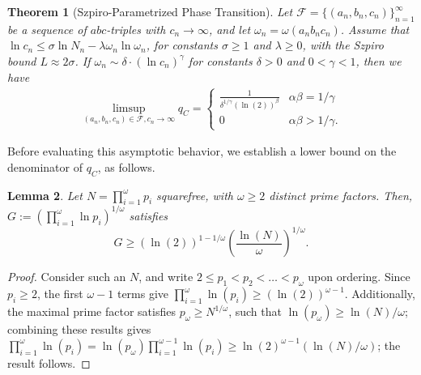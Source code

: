 \documentclass[11pt,letterpaper]{amsart}
\newtheorem{theorem}{Theorem}[section]
\newtheorem{lemma}[theorem]{Lemma}
\def\ra{\rightarrow}
\begin{document}
\begin{theorem}[Szpiro-Parametrized Phase Transition]
\label{T-szpiro}
Let $\mathcal{F} = \{(a_n, b_n, c_n)\}_{n=1}^{\infty}$ be a sequence of $abc$-triples with $c_n \to \infty$, and let $\omega_n = \omega(a_n b_n c_n)$. Assume that $\ln c_n \le \sigma \ln N_n - \lambda \omega_n \ln \omega_n$, for constants $\sigma \ge 1$ and $\lambda \ge 0$, with the Szpiro bound $L \approx 2\sigma$. If $\omega_n \sim \delta \cdot (\ln c_n)^\gamma$ for constants $\delta > 0$ and $0 < \gamma < 1$, then we have
\begin{align*}
    \limsup_{(a_n, b_n, c_n) \in \mathcal{F}, c_n \ra \infty} q_C = \begin{cases}
        \frac{1}{\delta^{1/\gamma} (\ln(2))^{\beta}} & \alpha \beta = 1/\gamma \\
        0 & \alpha \beta > 1/\gamma.
    \end{cases}
\end{align*}

\end{theorem}

Before evaluating this asymptotic behavior, we establish a lower bound on the denominator of $q_C$, as follows.

\begin{lemma}
\label{sqfree-lemma}
Let $N = \prod_{i=1}^\omega p_i$ squarefree, with $\omega \ge 2$ distinct prime factors. Then, $G := \left(\prod_{i=1}^\omega \ln p_i\right)^{1/\omega}$ satisfies
\[
    G \ge (\ln (2))^{1-1/\omega} \left( \frac{\ln (N)}{\omega} \right)^{1/\omega}.
\]
\end{lemma}

\begin{proof}
Consider such an $N$, and write $2 \leq p_1 < p_2 < \dotsc < p_{\omega}$ upon ordering. Since $p_i \ge 2$, the first $\omega - 1$ terms give $\prod_{i =1 }^{\omega} \ln(p_i) \ge (\ln(2))^{\omega - 1}$. Additionally, the maximal prime factor satisfies $p_{\omega} \ge N^{1/\omega}$, such that $\ln(p_{\omega}) \ge \ln(N)/\omega$; combining these results gives $\prod_{i = 1}^{\omega} \ln(p_i) = \ln(p_{\omega}) \prod_{i = 1}^{\omega - 1}\ln(p_i) \ge \ln(2)^{\omega - 1}(\ln(N)/\omega)$; the result follows.
\end{proof}
\end{document}
